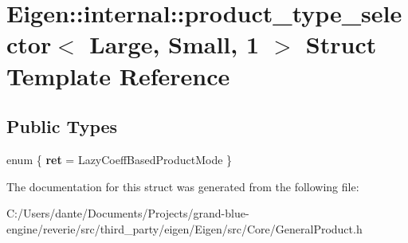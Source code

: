 \hypertarget{struct_eigen_1_1internal_1_1product__type__selector_3_01_large_00_01_small_00_011_01_4}{}\section{Eigen\+::internal\+::product\+\_\+type\+\_\+selector$<$ Large, Small, 1 $>$ Struct Template Reference}
\label{struct_eigen_1_1internal_1_1product__type__selector_3_01_large_00_01_small_00_011_01_4}
\subsection*{Public Types}
\begin{DoxyCompactItemize}
\item 
\mbox{\label{struct_eigen_1_1internal_1_1product__type__selector_3_01_large_00_01_small_00_011_01_4_af27cf7fd93d8a9c974b2a84925f1c8da}} 
enum \{ {\bfseries ret} = Lazy\+Coeff\+Based\+Product\+Mode
 \}
\end{DoxyCompactItemize}


The documentation for this struct was generated from the following file\+:\begin{DoxyCompactItemize}
\item 
C\+:/\+Users/dante/\+Documents/\+Projects/grand-\/blue-\/engine/reverie/src/third\+\_\+party/eigen/\+Eigen/src/\+Core/General\+Product.\+h\end{DoxyCompactItemize}
